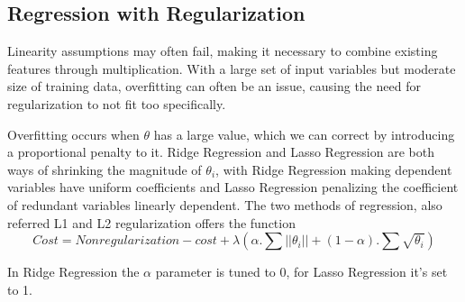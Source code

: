\documentclass{article}
\begin{document}
\begin{spacing}{1.1}
\subsection{Regression with Regularization}

Linearity assumptions may often fail, making it necessary to combine existing features through multiplication.  With a large set of input variables but moderate size of training data, overfitting can often be an issue, causing the need for regularization to not fit too specifically.  

\vspace{3mm}

Overfitting occurs when $\theta$ has a large value, which we can correct by introducing a proportional penalty to it.  Ridge Regression and Lasso Regression are both ways of shrinking the magnitude of $\theta_i$, with Ridge Regression making dependent variables have uniform coefficients and Lasso Regression penalizing the coefficient of redundant variables linearly dependent.  The two methods of regression, also referred L1 and L2 regularization offers the function
$$ Cost = Nonregularization-cost + \lambda(\alpha.\sum||\theta_i|| + (1-\alpha).\sum \sqrt{\theta_i}) $$

In Ridge Regression the $\alpha$ parameter is tuned to 0, for Lasso Regression it's set to 1.  


\end{spacing}
\end{document}

